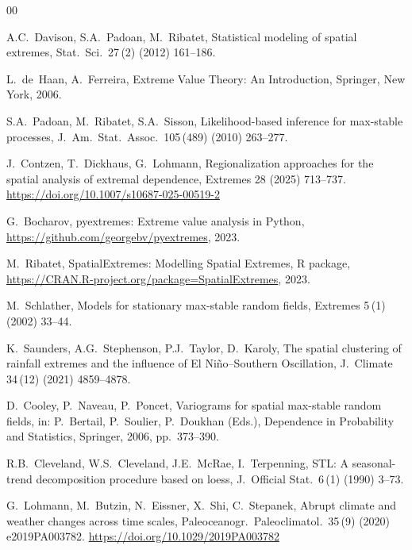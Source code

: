 \documentclass[preprint,12pt,a4paper]{elsarticle}
\newcommand{\rev}[1]{{#1}}
\begin{document}
\begin{thebibliography}{00}

A.C.~Davison, S.A.~Padoan, M.~Ribatet,
Statistical modeling of spatial extremes,
Stat.\ Sci.\ 27\,(2) (2012) 161--186.

L.~de~Haan, A.~Ferreira,
Extreme Value Theory: An Introduction,
Springer, New York, 2006.

S.A.~Padoan, M.~Ribatet, S.A.~Sisson,
Likelihood-based inference for max-stable processes,
J.\ Am.\ Stat.\ Assoc.\ 105\,(489) (2010) 263--277.

\rev{J.~Contzen, T.~Dickhaus, G.~Lohmann,
Regionalization approaches for the spatial analysis of extremal
dependence,
Extremes 28 (2025) 713--737.
\url{https://doi.org/10.1007/s10687-025-00519-2}}

G.~Bocharov,
pyextremes: Extreme value analysis in Python,
\url{https://github.com/georgebv/pyextremes}, 2023.

M.~Ribatet,
SpatialExtremes: Modelling Spatial Extremes,
R package, \url{https://CRAN.R-project.org/package=SpatialExtremes}, 2023.

M.~Schlather,
Models for stationary max-stable random fields,
Extremes 5\,(1) (2002) 33--44.

K.~Saunders, A.G.~Stephenson, P.J.~Taylor, D.~Karoly,
The spatial clustering of rainfall extremes and the influence of
El Ni\~{n}o--Southern Oscillation,
J.\ Climate 34\,(12) (2021) 4859--4878.

D.~Cooley, P.~Naveau, P.~Poncet,
Variograms for spatial max-stable random fields,
in: P.~Bertail, P.~Soulier, P.~Doukhan (Eds.),
Dependence in Probability and Statistics,
Springer, 2006, pp.~373--390.

\rev{R.B.~Cleveland, W.S.~Cleveland, J.E.~McRae, I.~Terpenning,
STL: A seasonal-trend decomposition procedure based on loess,
J.\ Official Stat.\ 6\,(1) (1990) 3--73.}

G.~Lohmann, M.~Butzin, N.~Eissner, X.~Shi, C.~Stepanek,
Abrupt climate and weather changes across time scales,
Paleoceanogr.\ Paleoclimatol.\ 35\,(9) (2020) e2019PA003782.
\url{https://doi.org/10.1029/2019PA003782}


\end{thebibliography}
\end{document}
